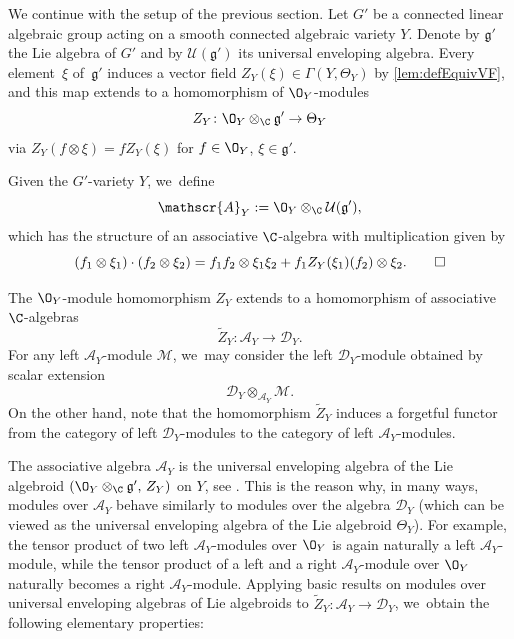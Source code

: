 \documentclass[JEP,XML,SOM,Unicode,published]{cedram}
\newcommand{\cA}{\mathscr{A}}
\newcommand{\frg}{\mathfrak{g}}
\begin{document}
We continue with the setup of the previous section. Let $G'$ be a connected linear algebraic group acting on a smooth connected algebraic variety $Y$. Denote by $\frg'$ the Lie algebra of $G'$ and by $\mathcal U(\frg')$ its universal enveloping algebra. Every element~$\xi$ of~$\frg'$ induces a vector field $Z_Y(\xi) \in \Gamma(Y,\Theta_Y)$ by \cref{lem:defEquivVF}, and this map extends to a homomorphism of $\O_Y$\nobreakdash-mod\-ules
\[
Z_Y \colon \O_Y \otimes_\C \frg' \to \Theta_Y
\]
via $Z_Y(f \otimes \xi) = f Z_Y(\xi)$ for $f \in \O_Y$, $\xi \in \frg'$.

\begin{dfn} \label{def:A}
Given the $G'$-variety $Y$, we~define
\[
\cA_Y := \O_Y \otimes_\C \mathcal U(\frg'),
\]
which has the structure of an associative $\C$-algebra with multiplication given by
\[
(f_1 \otimes \xi_1) \cdot (f_2 \otimes \xi_2) = f_1 f_2 \otimes \xi_1 \xi_2 + f_1 Z_Y(\xi_1)(f_2) \otimes \xi_2.\qedhere
\]
\end{dfn}

The $\O_Y$\nobreakdash-mod\-ule homomorphism $Z_Y$ extends to a homomorphism of associative $\C$-algebras
\[
\tilde{Z}_Y \colon \cA_Y \to \mathscr D_Y.
\]
For any left $\cA_Y$\nobreakdash-mod\-ule $\mathcal M$, we~may consider the left $\mathscr{D}_Y$\nobreakdash-mod\-ule obtained by scalar extension
\[
\mathscr{D}_Y \otimes_{\cA_Y} \mathcal{M}.
\]
On the other hand, note that the homomorphism $\tilde{Z}_Y$ induces a forgetful functor from the category of left $\mathscr{D}_Y$\nobreakdash-mod\-ules to the category of left $\cA_Y$\nobreakdash-mod\-ules.

The associative algebra $\cA_Y$ is the universal enveloping algebra of the Lie algebroid $(\O_Y \otimes_\C \frg',\, Z_Y)$ on $Y$, see \cite[1.8.4.\,Ex.]{BeilinsonBernstein_Jantzen}. This is the reason why, in many ways, modules over $\cA_Y$ behave similarly to modules over the algebra $\mathscr{D}_Y$ (which can be viewed as the universal enveloping algebra of the Lie algebroid $\Theta_Y$). For example, the tensor product of two left $\cA_Y$\nobreakdash-mod\-ules over $\O_Y$ is again naturally a left $\cA_Y$\nobreakdash-mod\-ule, while the tensor product of a left and a right $\cA_Y$\nobreakdash-mod\-ule over $\O_Y$ naturally becomes a right $\cA_Y$\nobreakdash-mod\-ule. Applying basic results on modules over universal enveloping algebras of Lie algebroids \cite[App.]{CN05} to $\tilde{Z}_Y \colon \cA_Y \to \mathscr{D}_Y$, we~obtain the following elementary properties:
\end{document}
